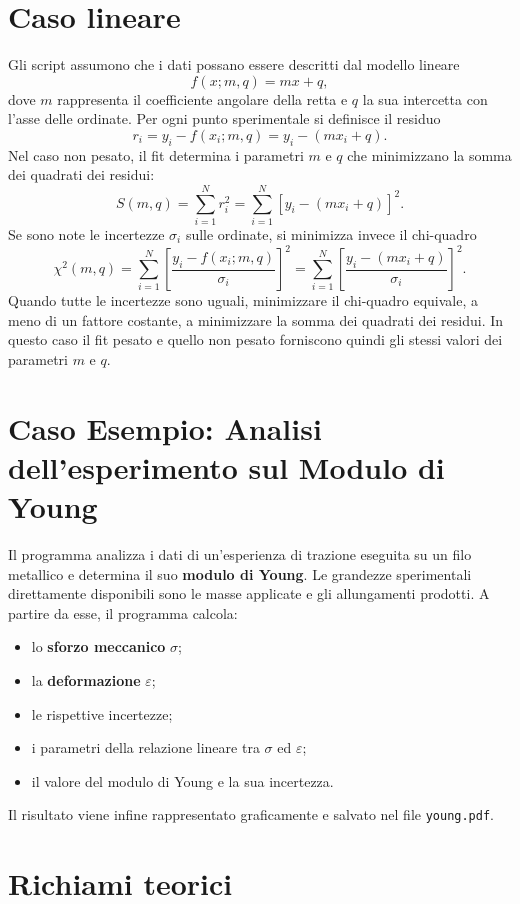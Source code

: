 \documentclass[11pt,a4paper]{book}
\begin{document}
\section{Caso lineare} Gli script assumono che i dati possano essere descritti dal modello lineare 
\[ f(x;m,q)=mx+q, \] 
dove $m$ rappresenta il coefficiente angolare della retta e $q$ la sua intercetta con l'asse delle ordinate. Per ogni punto sperimentale si definisce il residuo
\[ r_i=y_i-f(x_i;m,q) =y_i-(mx_i+q). \] 
Nel caso non pesato, il fit determina i parametri $m$ e $q$ che minimizzano la somma dei quadrati dei residui: 
\[ S(m,q)=\sum_{i=1}^{N} r_i^2 =\sum_{i=1}^{N}\left[y_i-(mx_i+q)\right]^2. \] 
Se sono note le incertezze $\sigma_i$ sulle ordinate, si minimizza invece il chi-quadro
\[ \chi^2(m,q)= \sum_{i=1}^{N} \left[ \frac{y_i-f(x_i;m,q)}{\sigma_i} \right]^2 = \sum_{i=1}^{N} \left[ \frac{y_i-(mx_i+q)}{\sigma_i} \right]^2. \] 
Quando tutte le incertezze sono uguali, minimizzare il chi-quadro equivale, a meno di un fattore costante, a minimizzare la somma dei quadrati dei residui. In questo caso il fit pesato e quello non pesato forniscono quindi gli stessi valori dei parametri $m$ e $q$.

\section{Caso Esempio: Analisi dell'esperimento sul Modulo di Young}

Il programma analizza i dati di un'esperienza di trazione eseguita su un filo metallico e determina il suo \textbf{modulo di Young}. Le grandezze sperimentali direttamente disponibili sono le masse applicate e gli allungamenti prodotti. A partire da esse, il programma calcola:

\begin{itemize}
    \item lo \textbf{sforzo meccanico} $\sigma$;
    \item la \textbf{deformazione} $\varepsilon$;
    \item le rispettive incertezze;
    \item i parametri della relazione lineare tra $\sigma$ ed $\varepsilon$;
    \item il valore del modulo di Young e la sua incertezza.
\end{itemize}

Il risultato viene infine rappresentato graficamente e salvato nel file \texttt{young.pdf}.

\section{Richiami teorici}
\end{document}
